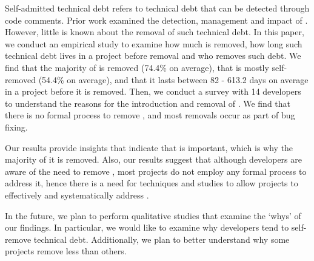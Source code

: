 Self-admitted technical debt refers to technical debt that can be detected through code comments. Prior work examined the detection, management and impact of \SATD. However, little is known about the removal of such technical debt. In this paper, we conduct an empirical study to examine how much \SATD is removed, how long such technical debt lives in a project before removal and who removes such debt. We find that the majority of \SATD is removed (74.4\% on average), that \SATD is mostly self-removed (54.4\% on average), and that it lasts between 82 - 613.2 days on average in a project before it is removed. Then, we conduct a survey with 14 developers to understand the reasons for the introduction and removal of \SATD. We find that there is no formal process to remove \SATD, and most removals occur as part of bug fixing.

Our results provide insights that indicate that \SATD is important, which is why the majority of it is removed. Also, our results suggest that although developers are aware of the need to remove \SATD, most projects do not employ any formal process to address it, hence there is a need for techniques and studies to allow projects to effectively and systematically address \SATD.

In the future, we plan to perform qualitative studies that examine the `whys' of our findings. In particular, we would like to examine why developers tend to self-remove technical debt. Additionally, we plan to better understand why some projects remove less \SATD than others. 

